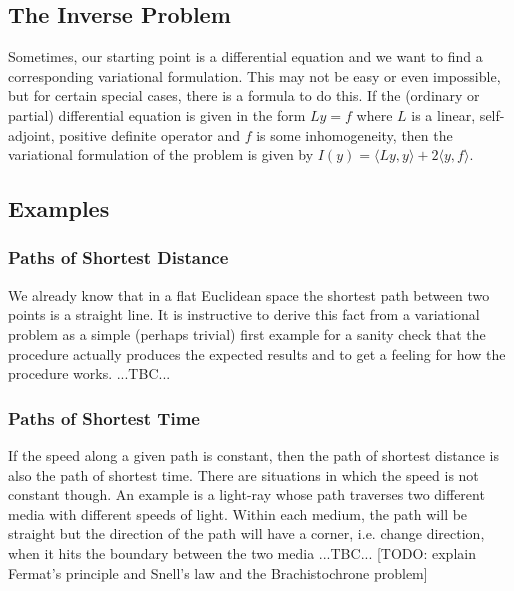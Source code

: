

\subsection{The Inverse Problem}
Sometimes, our starting point is a differential equation and we want to find a corresponding variational formulation. This may not be easy or even impossible, but for certain special cases, there is a formula to do this. If the (ordinary or partial) differential equation is given in the form $L y = f$ where $L$ is a linear, self-adjoint, positive definite operator and $f$ is some inhomogeneity, then the variational formulation of the problem is given by $I(y) = \langle L y, y \rangle + 2 \langle y, f \rangle $.


\subsection{Examples}

\subsubsection{Paths of Shortest Distance}
We already know that in a flat Euclidean space the shortest path between two points is a straight line. It is instructive to derive this fact from a variational problem as a simple (perhaps trivial) first example for a sanity check that the procedure actually produces the expected results and to get a feeling for how the procedure works. ...TBC...

\subsubsection{Paths of Shortest Time}
If the speed along a given path is constant, then the path of shortest distance is also the path of shortest time. There are situations in which the speed is not constant though. An example is a light-ray whose path traverses two different media with different speeds of light. Within each medium, the path will be straight but the direction of the path will have a corner, i.e. change direction, when it hits the boundary between the two media ...TBC... [TODO: explain Fermat's principle and Snell's law and the Brachistochrone problem]

